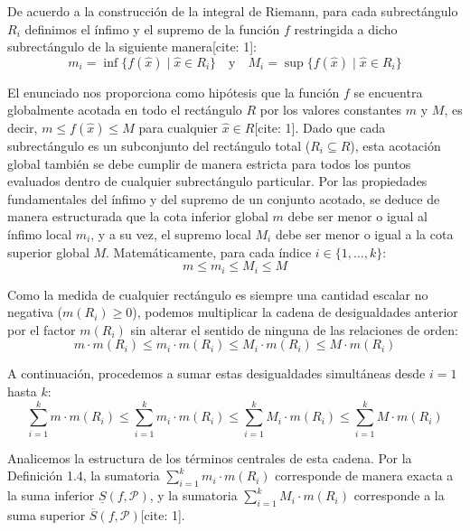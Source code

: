 \documentclass[11pt,letterpaper]{article}
\begin{document}
De acuerdo a la construcción de la integral de Riemann, para cada subrectángulo $R_{i}$ definimos el ínfimo y el supremo de la función $f$ restringida a dicho subrectángulo de la siguiente manera[cite: 1]:
\begin{equation*}
m_{i} = \inf \{f(\hat{x}) \mid \hat{x} \in R_{i}\} \quad \text{y} \quad M_{i} = \sup \{f(\hat{x}) \mid \hat{x} \in R_{i}\}
\end{equation*}

El enunciado nos proporciona como hipótesis que la función $f$ se encuentra globalmente acotada en todo el rectángulo $R$ por los valores constantes $m$ y $M$, es decir, $m \le f(\hat{x}) \le M$ para cualquier $\hat{x} \in R$[cite: 1]. 
Dado que cada subrectángulo es un subconjunto del rectángulo total ($R_{i} \subseteq R$), esta acotación global también se debe cumplir de manera estricta para todos los puntos evaluados dentro de cualquier subrectángulo particular. Por las propiedades fundamentales del ínfimo y del supremo de un conjunto acotado, se deduce de manera estructurada que la cota inferior global $m$ debe ser menor o igual al ínfimo local $m_{i}$, y a su vez, el supremo local $M_{i}$ debe ser menor o igual a la cota superior global $M$. Matemáticamente, para cada índice $i \in \{1, \dots, k\}$:
\begin{equation*}
m \le m_{i} \le M_{i} \le M
\end{equation*}

Como la medida de cualquier rectángulo es siempre una cantidad escalar no negativa ($m(R_{i}) \ge 0$), podemos multiplicar la cadena de desigualdades anterior por el factor $m(R_{i})$ sin alterar el sentido de ninguna de las relaciones de orden:
\begin{equation*}
m \cdot m(R_{i}) \le m_{i} \cdot m(R_{i}) \le M_{i} \cdot m(R_{i}) \le M \cdot m(R_{i})
\end{equation*}

A continuación, procedemos a sumar estas desigualdades simultáneas desde $i=1$ hasta $k$:
\begin{equation*}
\sum_{i=1}^{k} m \cdot m(R_{i}) \le \sum_{i=1}^{k} m_{i} \cdot m(R_{i}) \le \sum_{i=1}^{k} M_{i} \cdot m(R_{i}) \le \sum_{i=1}^{k} M \cdot m(R_{i})
\end{equation*}

Analicemos la estructura de los términos centrales de esta cadena. Por la Definición 1.4, la sumatoria $\sum_{i=1}^{k} m_{i} \cdot m(R_{i})$ corresponde de manera exacta a la suma inferior $\underline{S}(f,\mathcal{P})$, y la sumatoria $\sum_{i=1}^{k} M_{i} \cdot m(R_{i})$ corresponde a la suma superior $\overline{S}(f,\mathcal{P})$[cite: 1].
\end{document}
